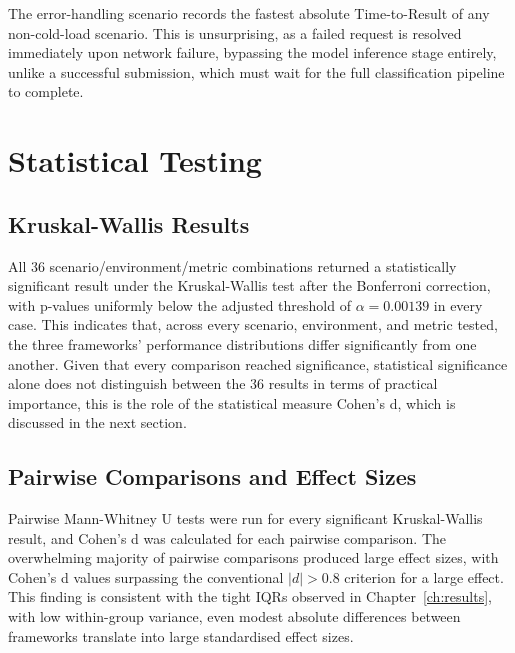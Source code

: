 \documentclass[11pt,a4paper]{report}
\begin{document}
\vspace{5mm}

The error-handling scenario records the fastest absolute Time-to-Result of any non-cold-load scenario. This is unsurprising, as a failed request is resolved immediately upon network failure, bypassing the model inference stage entirely, unlike a successful submission, which must wait for the full classification pipeline to complete.

\section{Statistical Testing}

\subsection{Kruskal-Wallis Results}

\vspace{5mm}

All 36 scenario/environment/metric combinations returned a statistically significant result under the Kruskal-Wallis test after the Bonferroni correction, with p-values uniformly below the adjusted threshold of $\alpha = 0.00139$ in every case. This indicates that, across every scenario, environment, and metric tested, the three frameworks' performance distributions differ significantly from one another. Given that every comparison reached significance, statistical significance alone does not distinguish between the 36 results in terms of practical importance, this is the role of the statistical measure Cohen's d, which is discussed in the next section.   

\subsection{Pairwise Comparisons and Effect Sizes}

\vspace{5mm}

Pairwise Mann-Whitney U tests were run for every significant Kruskal-Wallis result, and Cohen's d was calculated for each pairwise comparison. The overwhelming majority of pairwise comparisons produced large effect sizes, with Cohen's d values surpassing the conventional $|d| > 0.8$ criterion for a large effect. This finding is consistent with the tight IQRs observed in Chapter~\ref{ch:results}, with low within-group variance, even modest absolute differences between frameworks translate into large standardised effect sizes. 
\end{document}

